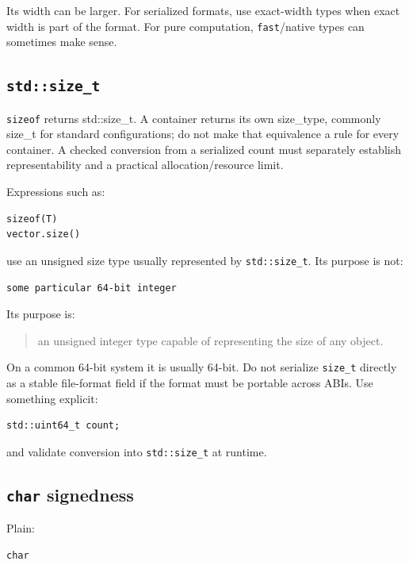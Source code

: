Its width can be larger. For serialized formats, use exact-width types when exact width is part of the format. For pure computation, \texttt{fast}/native types can sometimes make sense.

\subsection{\texorpdfstring{\texttt{std::size\_t}}{std::size\_t}}\label{05-engine-i-ch002-stdsize_t}

\texttt{sizeof} returns std::size\_t. A container returns its own size\_type, commonly size\_t for standard configurations; do not make that equivalence a rule for every container. A checked conversion from a serialized count must separately establish representability and a practical allocation/resource limit.

Expressions such as:

\begin{verbatim}
sizeof(T)
vector.size()
\end{verbatim}

use an unsigned size type usually represented by \texttt{std::size\_t}. Its purpose is not:

\begin{verbatim}
some particular 64-bit integer
\end{verbatim}

Its purpose is:

\begin{quote}
an unsigned integer type capable of representing the size of any object.
\end{quote}

On a common 64-bit system it is usually 64-bit. Do not serialize \texttt{size\_t} directly as a stable file-format field if the format must be portable across ABIs. Use something explicit:

\begin{verbatim}
std::uint64_t count;
\end{verbatim}

and validate conversion into \texttt{std::size\_t} at runtime.

\subsection{\texorpdfstring{\texttt{char} signedness}{char signedness}}\label{05-engine-i-ch002-char-signedness}

Plain:

\begin{verbatim}
char
\end{verbatim}

